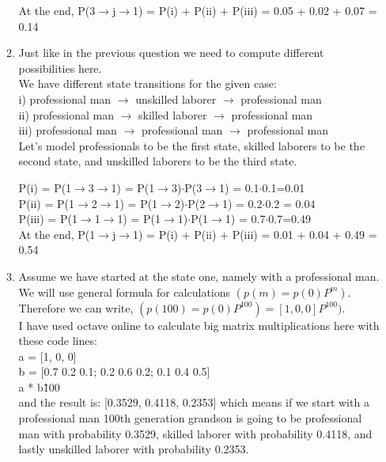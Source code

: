 \documentclass[12pt,a4paper, margin=1in]{article}
\begin{document}
\begin{enumerate}
\begin{enumerate}
            At the end, P(3$\rightarrow$j$\rightarrow$1) = P(i) + P(ii) + P(iii) = 0.05 + 0.02 + 0.07 = 0.14
            
            \item Just like in the previous question we need to compute different possibilities here.\\
            We have different state transitions for the given case:\\
            i) professional man $\rightarrow$ unskilled laborer $\rightarrow$ professional man\\
            ii) professional man $\rightarrow$ skilled laborer $\rightarrow$ professional man\\
            iii) professional man $\rightarrow$ professional man $\rightarrow$ professional man\\

            Let's model professionals to be the first state, skilled laborers to be the second state, and unskilled laborers to be the third state.

            P(i) = P(1$\rightarrow$3$\rightarrow$1) = P(1$\rightarrow$3)$\cdot$P(3$\rightarrow$1) = 0.1$\cdot$0.1=0.01\\
            P(ii) = P(1$\rightarrow$2$\rightarrow$1) = P(1$\rightarrow$2)$\cdot$P(2$\rightarrow$1) = 0.2$\cdot$0.2 = 0.04\\
            P(iii) = P(1$\rightarrow$1$\rightarrow$1) = P(1$\rightarrow$1)$\cdot$P(1$\rightarrow$1) = 0.7$\cdot$0.7=0.49\\

            At the end, P(1$\rightarrow$j$\rightarrow$1) = P(i) + P(ii) + P(iii) = 0.01 + 0.04 + 0.49 = 0.54

            \newpage
            
            \item Assume we have started at the state one, namely with a professional man. We will use general formula for calculations $(p(m)=p(0)P^m)$.\\
            Therefore we can write, $(p(100)=p(0)P^{100})=[1,0,0]P^{100})$.\\

            I have used octave online to calculate big matrix multiplications here with these code lines:\\
            a = [1, 0, 0]\\
            b = [0.7 0.2 0.1; 0.2 0.6 0.2; 0.1 0.4 0.5]\\
            a * b\^ 100\\
            and the result is: [0.3529, 0.4118, 0.2353] which means if we start with a professional man 100th generation grandson is going to be professional man with probability 0.3529, skilled laborer with probability 0.4118, and lastly unskilled laborer with probability 0.2353.
        \end{enumerate}
        

\end{enumerate}
\end{document}

